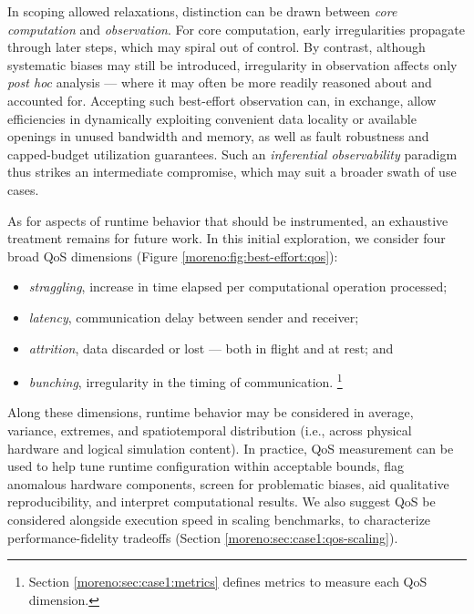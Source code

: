 In scoping allowed relaxations, distinction can be drawn between \textit{core computation} and \textit{observation}.
For core computation, early irregularities propagate through later steps, which may spiral out of control.
By contrast, although systematic biases may still be introduced, irregularity in observation affects only \textit{post hoc} analysis --- where it may often be more readily reasoned about and accounted for.
Accepting such best-effort observation can, in exchange, allow efficiencies in dynamically exploiting convenient data locality or available openings in unused bandwidth and memory, as well as fault robustness and capped-budget utilization guarantees.
Such an \textit{inferential observability} paradigm thus strikes an intermediate compromise, which may suit a broader swath of use cases.

As for aspects of runtime behavior that should be instrumented, an exhaustive treatment remains for future work.
In this initial exploration, we consider four broad QoS dimensions (Figure \ref{moreno:fig:best-effort:qos}):
\begin{itemize}
  \item \textit{straggling}, increase in time elapsed per computational operation processed;
  \item \textit{latency}, communication delay between sender and receiver;
  \item \textit{attrition}, data discarded or lost --- both in flight and at rest; and
  \item \textit{bunching}, irregularity in the timing of communication.
  \unskip\footnote{%
  Section \ref{moreno:sec:case1:metrics} defines metrics to measure each QoS dimension.
  }
\end{itemize}

Along these dimensions, runtime behavior may be considered in average, variance, extremes, and spatiotemporal distribution (i.e., across physical hardware and logical simulation content).
In practice, QoS measurement can be used to help tune runtime configuration within acceptable bounds, flag anomalous hardware components, screen for problematic biases, aid qualitative reproducibility, and interpret computational results.
We also suggest QoS be considered alongside execution speed in scaling benchmarks, to characterize performance-fidelity tradeoffs (Section \ref{moreno:sec:case1:qos-scaling}).

